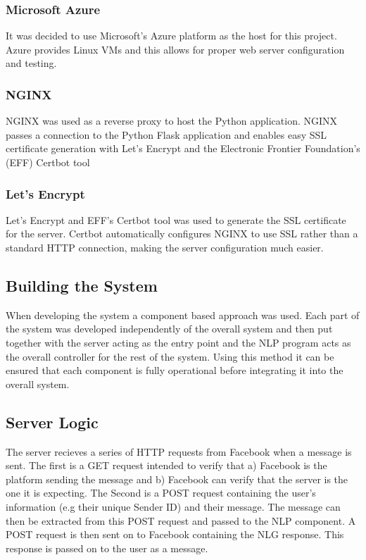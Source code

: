 \documentclass[12pt,a4paper]{article}
\begin{document}
    \subsubsection{Microsoft Azure}
    It was decided to use Microsoft's Azure platform as the host for this project. Azure provides Linux VMs and this allows for proper web server configuration and testing.
    
    \subsubsection{NGINX}
    NGINX was used as a reverse proxy to host the Python application. NGINX passes a connection to the Python Flask application and enables easy SSL certificate generation with Let's Encrypt and the Electronic Frontier Foundation's (EFF) Certbot tool %
    
    \subsubsection{Let's Encrypt}
    Let's Encrypt and EFF's Certbot tool was used to generate the SSL certificate for the server. Certbot automatically configures NGINX to use SSL rather than a standard HTTP connection, making the server configuration much easier.
    
    \subsection{Building the System}
    When developing the system a component based approach was used. Each part of the system was developed independently of the overall system and then put together with the server acting as the entry point and the NLP program acts as the overall controller for the rest of the system. Using this method it can be ensured that each component is fully operational before integrating it into the overall system.
    
    \subsection{Server Logic}
    The server recieves a series of HTTP requests from Facebook when a message is sent. The first is a GET request intended to verify that a) Facebook is the platform sending the message and b) Facebook can verify that the server is the one it is expecting. The Second is a POST request containing the user's information (e.g their unique Sender ID) and their message. The message can then be extracted from this POST request and passed to the NLP component. A POST request is then sent on to Facebook containing the NLG response. This response is passed on to the user as a message.
    
\end{document}
